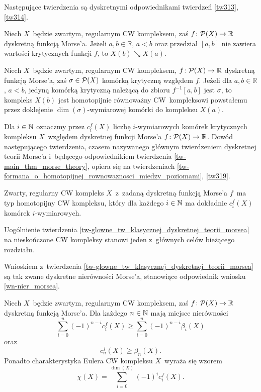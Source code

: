 Następujące twierdzenia są dyskretnymi odpowiednikami twierdzeń \ref{tw313}, \ref{tw314}.

\begin{tw}\label{tw-formana_o_homotopijnej_rownowaznosci_miedzy_poziomami}
Niech $X$~będzie zwartym, regularnym CW kompleksem, zaś $f\colon \mathcal{P}(X)\to\mathbb{R}$ dyskretną funkcją Morse'a. Jeżeli $a,b\in\mathbb{R}$, $a<b$ oraz przedział $[a,b]$ nie zawiera wartości krytycznych funkcji $f$, to $X(b)\searrow X(a)$.
\end{tw}

\begin{tw}\label{tw319}
Niech $X$~będzie zwartym, regularnym CW kompleksem, $f\colon \mathcal{P}(X)\to\mathbb{R}$ dyskretną funkcją Morse'a, zaś $\sigma\in \mathcal{P}(X)$ komórką krytyczną względem $f$. Jeżeli dla $a,b\in\mathbb{R}$, $a<b$, jedyną komórką krytyczną należącą do zbioru $f^{-1}[a,b]$ jest $\sigma$, to kompleks $X(b)$ jest homotopijnie równoważny CW~kompleksowi powstałemu przez doklejenie $\dim(\sigma)$-wymiarowej komórki do kompleksu $X(a)$.
\end{tw}

Dla $i\in\mathbb{N}$ oznaczmy przez $c_i^f(X)$ liczbę $i$-wymiarowych komórek krytycznych kompleksu $X$~względem dyskretnej funkcji Morse'a $f\colon \mathcal{P}(X)\to \mathbb{R}$. Dowód następującego twierdzenia, czasem nazywanego głównym twierdzeniem dyskretnej teorii Morse'a i~będącego odpowiednikiem twierdzenia \ref{tw-main_thm_morse_theory}, opiera się na twierdzeniach \ref{tw-formana_o_homotopijnej_rownowaznosci_miedzy_poziomami}, \ref{tw319}.

\begin{tw}\label{tw-glowne_tw_klasycznej_dyskretnej_teorii_morsea}
Zwarty, regularny CW kompleks $X$~z~zadaną dyskretną funkcją Morse'a $f$~ma typ homotopijny CW kompleksu, który dla każdego $i\in\mathbb{N}$ ma dokładnie $c_i^f(X)$ komórek $i$-wymiarowych.
\end{tw}

Uogólnienie twierdzenia \ref{tw-glowne_tw_klasycznej_dyskretnej_teorii_morsea} na nieskończone CW kompleksy stanowi jeden z~głównych celów bieżącego rozdziału.

Wnioskiem z~twierdzenia \ref{tw-glowne_tw_klasycznej_dyskretnej_teorii_morsea} są tak zwane dyskretne nierówności Morse'a, stanowiące odpowiednik wniosku \ref{wn-nier_morsea}.

\begin{wn}\label{wn-klasyczne_dyskretne_nierownosci_morsea}
Niech $X$~będzie zwartym, regularnym CW kompleksem, zaś $f\colon \mathcal{P}(X)\to\mathbb{R}$ dyskretną funkcją Morse'a. Dla każdego $n\in\mathbb{N}$ mają miejsce nierówności
\[\sum_{i=0}^{n}(-1)^{n-i}c_i^f(X)\geq \sum_{i=0}^{n}(-1)^{n-i}\beta_i(X)\]
oraz
\[c_n^f(X)\geq \beta_n(X).\] Ponadto charakterystyka Eulera CW kompleksu $X$~wyraża się wzorem \[\chi(X)=\sum_{i=0}^{\dim(X)}(-1)^i c_i^f(X).\]
\end{wn}

